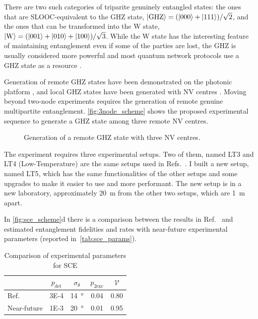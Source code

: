 \documentclass[a4paper, twoside]{article}
\begin{document}
There are two such categories of triparite genuinely entangled states: the ones that are \ac{SLOOC}-equivalent to the \ac{GHZ} state, $\ket{\text{GHZ}} = (\ket{000} + \ket{111})/\sqrt 2 $, and the ones that can be transformed into the W state, $\ket{\text{W}} = (\ket{001} + \ket{010} + \ket{100})/\sqrt 3 $. While the W state has the interesting feature of maintaining entanglement even if some of the parties are lost, the \ac{GHZ} is usually considered more powerful and most quantum network protocols use a GHZ state as a resource . 

Generation of remote GHZ states have been demonstrated on the photonic platform \cite{Bouwmeester1999}, and local GHZ states have been generated with \ac{NV} centres . Moving beyond two-node experiments requires the generation of remote genuine multipartite entanglement. \autoref{fig:3node_scheme} shows the proposed experimental sequence to generate a GHZ state among three remote \ac{NV} centres.

\begin{figure}
	\caption{Generation of a remote GHZ state with three \ac{NV} centres.}
	\label{fig:3node_scheme}
\end{figure}

The experiment requires three experimental setups. Two of them, named LT3 and LT4 (Low-Temperature) are the same setups used in Refs.~\cite{Kalb2017, Humphreys2018}.
I built a new setup, named LT5, which has the same functionalities of the other setups and some upgrades to make it easier to use and more performant. The new setup is in a new laboratory, approximately \SI{20}{m} from the other two setups, which are \SI{1}{m} apart.


In \autoref{fig:sce_scheme}d there is a comparison between the results in Ref.~\cite{Humphreys2018} and estimated entanglement fidelities and rates with near-future experimental parameters (reported in~\autoref{tab:sce_params}). 

\begin{table}
	\begin{center}
		\begin{tabular}{lcccc}
			\toprule
			& $p_\text{det}$ & $\sigma_\theta$ & $p_\text{2exc}$ & $\mathcal V$\\
			\hline
			Ref. \cite{Humphreys2018} & \SI{3E-4}{} & \SI{14}{\degree} & 0.04 & 0.80\\ 
			\hline 
			Near-future & \SI{1E-3}{} & \SI{20}{\degree} & 0.01 & 0.95\\ 
			\bottomrule 
		\end{tabular}
	\end{center}
	\caption{Comparison of experimental parameters for \ac{SCE}}
	\label{tab:sce_params}
\end{table}
 
\end{document}
